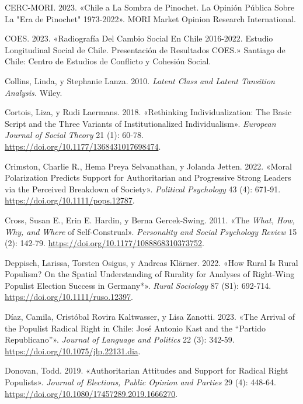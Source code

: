 \documentclass[
  letterpaper,
  DIV=11,
  numbers=noendperiod]{scrartcl}
\newlength{\cslhangindent}
\newenvironment{CSLReferences}[2] %
 {\begin{list}{}{%
  \setlength{\itemindent}{0pt}
  \setlength{\leftmargin}{0pt}
  \setlength{\parsep}{0pt}
  \ifodd #1
   \setlength{\leftmargin}{\cslhangindent}
   \setlength{\itemindent}{-1\cslhangindent}
  \fi
  \setlength{\itemsep}{#2\baselineskip}}}
 {\end{list}}
\begin{document}
\begin{CSLReferences}{1}{0}
CERC-MORI. 2023. {«Chile a La Sombra de {Pinochet}. {La} Opini{ó}n
P{ú}blica Sobre La "{Era} de {Pinochet}" 1973-2022»}. MORI Market
Opinion Research International.

COES. 2023. {«Radiograf{í}a Del {Cambio Social} En {Chile} 2016-2022.
{Estudio Longitudinal Social} de {Chile}. {Presentaci{ó}n} de
{Resultados COES}.»} Santiago de Chile: Centro de Estudios de Conflicto
y Cohesi{ó}n Social.

Collins, Linda, y Stephanie Lanza. 2010. \emph{Latent Class and Latent
Tansition Analysis.} Wiley.

Cortois, Liza, y Rudi Laermans. 2018. {«Rethinking Individualization:
{The} Basic Script and the Three Variants of Institutionalized
Individualism»}. \emph{European Journal of Social Theory} 21 (1): 60-78.
\url{https://doi.org/10.1177/1368431017698474}.

Crimston, Charlie R., Hema Preya Selvanathan, y Jolanda Jetten. 2022.
{«Moral {Polarization Predicts Support} for {Authoritarian} and
{Progressive Strong Leaders} via the {Perceived Breakdown} of
{Society}»}. \emph{Political Psychology} 43 (4): 671-91.
\url{https://doi.org/10.1111/pops.12787}.

Cross, Susan E., Erin E. Hardin, y Berna Gercek-Swing. 2011. {«The
{\emph{What}}{\emph{,} }{\emph{How}}{\emph{,} }{\emph{Why}}{\emph{, and}
}{\emph{Where}} of {Self-Construal}»}. \emph{Personality and Social
Psychology Review} 15 (2): 142-79.
\url{https://doi.org/10.1177/1088868310373752}.

Deppisch, Larissa, Torsten Osigus, y Andreas Klärner. 2022. {«How
{Rural} Is {Rural Populism}? {On} the {Spatial Understanding} of
{Rurality} for {Analyses} of {Right}-Wing {Populist Election Success} in
{Germany}*»}. \emph{Rural Sociology} 87 (S1): 692-714.
\url{https://doi.org/10.1111/ruso.12397}.

Díaz, Camila, Cristóbal Rovira Kaltwasser, y Lisa Zanotti. 2023. {«The
Arrival of the Populist Radical Right in {Chile}: {Jos{é} Antonio Kast}
and the {``{Partido Republicano}''}»}. \emph{Journal of Language and
Politics} 22 (3): 342-59. \url{https://doi.org/10.1075/jlp.22131.dia}.

Donovan, Todd. 2019. {«Authoritarian Attitudes and Support for Radical
Right Populists»}. \emph{Journal of Elections, Public Opinion and
Parties} 29 (4): 448-64.
\url{https://doi.org/10.1080/17457289.2019.1666270}.


\end{CSLReferences}
\end{document}
